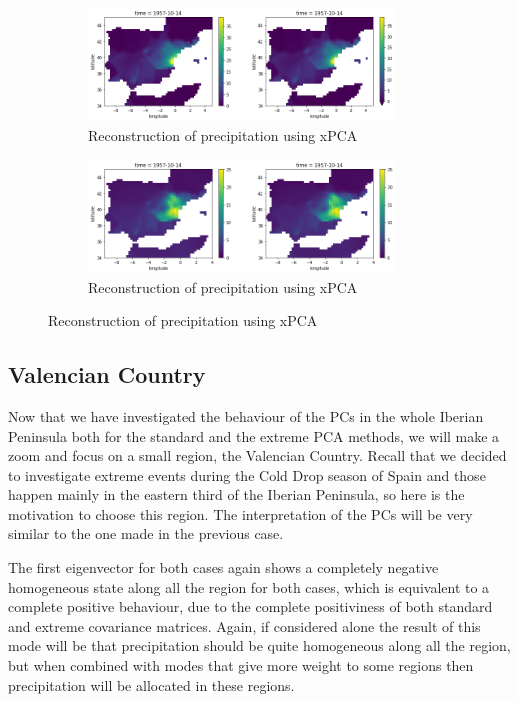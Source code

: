 \documentclass[11pt, oneside]{book}
\theoremstyle{plain}
\theoremstyle{remark}
\begin{document}
\begin{figure}[h!]
\centering
\begin{subfigure}{.5\textwidth}
    \centering
    \includegraphics[width=.95\linewidth, height=3cm]{spain-rec}
    \caption{Reconstruction of precipitation using xPCA}
\end{subfigure}%
\begin{subfigure}{.5\textwidth}
    \centering
    \includegraphics[width=.95\linewidth, height=3cm]{spain-tran-rec}
    \caption{Reconstruction of precipitation using xPCA}
\end{subfigure}
\end{figure}

\subsection{Valencian Country}
Now that we have investigated the behaviour of the PCs in the whole Iberian
Peninsula both for the standard and the extreme PCA methods, we will make a zoom
and focus on a small region, the Valencian Country. Recall that we decided to
investigate extreme events during the Cold Drop season of Spain and those
happen mainly in the eastern third of the Iberian Peninsula, so here is the
motivation to choose this region. The interpretation of the PCs will be very
similar to the one made in the previous case.  

The first eigenvector for both cases again shows a completely negative
homogeneous state along all the region for both cases, which is equivalent to a
complete positive behaviour, due to the complete positiviness of both standard
and extreme covariance matrices. Again, if considered alone the result of this
mode will be that precipitation should be quite homogeneous along all the
region, but when combined with modes that give more weight to some regions
then precipitation will be allocated in these regions.    
\end{document}
